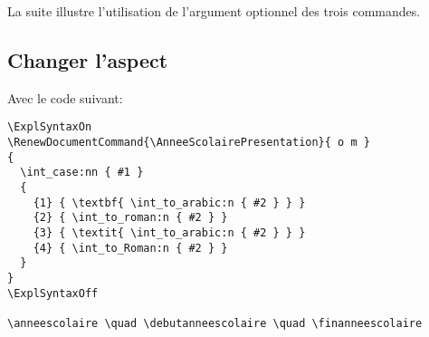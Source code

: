 \documentclass[full]{l3doc}
\begin{document}
\medskip{}

La suite illustre l'utilisation de l'argument optionnel des trois commandes.

\vspace{\baselineskip}



\subsection{Changer l'aspect}
\label{sec:aspect}

Avec le code suivant:


\begin{Verbatim}[gobble=0, frame=lines, label={code}, labelposition=topline]
\ExplSyntaxOn
\RenewDocumentCommand{\AnneeScolairePresentation}{ o m }
{
  \int_case:nn { #1 }
  {
    {1} { \textbf{ \int_to_arabic:n { #2 } } }
    {2} { \int_to_roman:n { #2 } }
    {3} { \textit{ \int_to_arabic:n { #2 } } }
    {4} { \int_to_Roman:n { #2 } }
  }
}
\ExplSyntaxOff

\anneescolaire \quad \debutanneescolaire \quad \finanneescolaire
\end{Verbatim}
\end{document}
